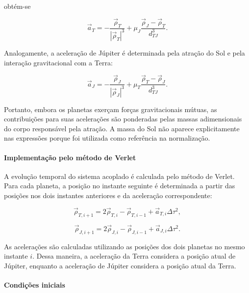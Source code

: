 \documentclass[12pt,a4paper]{article}
\begin{document}
obtém-se

\begin{equation}
    \boxed{
    \vec{a}_T=
    -\frac{\vec{\rho}_T}{|\vec{\rho}_T|^3}
    +
    \mu_J
    \frac{\vec{\rho}_J-\vec{\rho}_T}{d_{TJ}^3}
    }.
\end{equation}

Analogamente, a aceleração de Júpiter é determinada pela atração do Sol e pela interação gravitacional com a Terra:

\begin{equation}
    \boxed{
    \vec{a}_J=
    -\frac{\vec{\rho}_J}{|\vec{\rho}_J|^3}
    +
    \mu_T
    \frac{\vec{\rho}_T-\vec{\rho}_J}{d_{TJ}^3}
    }.
\end{equation}

Portanto, embora os planetas exerçam forças gravitacionais mútuas, as contribuições para suas acelerações são ponderadas pelas massas adimensionais do corpo responsável pela atração. A massa do Sol não aparece explicitamente nas expressões porque foi utilizada como referência na normalização.

\paragraph{Implementação pelo método de Verlet}

A evolução temporal do sistema acoplado é calculada pelo método de Verlet. Para cada planeta, a posição no instante seguinte é determinada a partir das posições nos dois instantes anteriores e da aceleração correspondente:

\begin{equation}
    \vec{\rho}_{T,i+1}
    =
    2\vec{\rho}_{T,i}
    -
    \vec{\rho}_{T,i-1}
    +
    \vec{a}_{T,i}\Delta\tau^2,
\end{equation}

\begin{equation}
    \vec{\rho}_{J,i+1}
    =
    2\vec{\rho}_{J,i}
    -
    \vec{\rho}_{J,i-1}
    +
    \vec{a}_{J,i}\Delta\tau^2.
\end{equation}

As acelerações são calculadas utilizando as posições dos dois planetas no mesmo instante $i$. Dessa maneira, a aceleração da Terra considera a posição atual de Júpiter, enquanto a aceleração de Júpiter considera a posição atual da Terra.

\paragraph{Condições iniciais}
\end{document}
